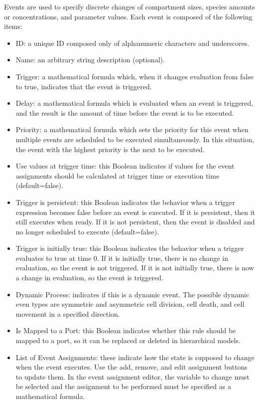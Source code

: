 \documentclass[titlepage,11pt]{article}
\begin{document}
\noindent
Events are used to specify discrete changes of compartment sizes, species amounts or concentrations, and parameter values.  Each event is composed of the following items:
\begin{itemize}
\item ID: a unique ID composed only of alphanumeric characters and underscores.
\item Name: an arbitrary string description (optional).
\item Trigger: a mathematical formula which, when it changes evaluation from false to true, indicates that the event is triggered.
\item Delay: a mathematical formula which is evaluated when an event is triggered, and the result is the amount of time before the event is to be executed.
\item Priority: a mathematical formula which sets the priority for this event when multiple events are scheduled to be executed simultaneously.  In this situation, the event with the highest priority is the next to be executed.
\item Use values at trigger time: this Boolean indicates if values for the event assignments should be calculated at trigger time or execution time (default=false).
\item Trigger is persistent: this Boolean indicates the behavior when a trigger expression becomes false before an event is executed.  If it is persistent, then it still executes when ready.  If it is not persistent, then the event is disabled and no longer scheduled to execute (default=false).
\item Trigger is initially true: this Boolean indicates the behavior when a trigger evaluates to true at time 0.  If it is initially true, there is no change in evaluation, so the event is not triggered.  If it is not initially true, there is now a change in evaluation, so the event is triggered.
\item Dynamic Process: indicates if this is a dynamic event.  The possible dynamic even types are symmetric and asymmetric cell division, cell death, and cell movement in a specified direction.
\item Is Mapped to a Port: this Boolean indicates whether this rule should be mapped to a port, so it can be replaced or deleted in hierarchical models.
\item List of Event Assignments: these indicate how the state is supposed to change when the event executes.  Use the add, remove, and edit assignment buttons to update them.  In the event assignment editor, the variable to change must be selected and the assignment to be performed must be specified as a mathematical formula.
\end{itemize}
\end{document}
